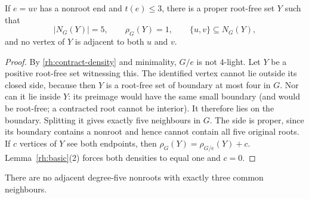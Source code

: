 \begin{lemma}\label{rh:blocker}
If $e=uv$ has a nonroot end and $t(e)\le3$, there is a proper root-free
set $Y$ such that
\[
 |N_G(Y)|=5,\qquad \rho_G(Y)=1,\qquad \{u,v\}\subseteq N_G(Y),
\]
and no vertex of $Y$ is adjacent to both $u$ and $v$.
\end{lemma}

\begin{proof}
By \eqref{rh:contract-density} and minimality, $G/e$ is not $4$-light.
Let $Y$ be a positive root-free set witnessing this. The identified
vertex cannot lie outside its closed side, because then $Y$ is a
root-free set of boundary at most four in $G$. Nor can it lie inside
$Y$: its preimage would have the same small boundary (and would be
root-free; a contracted root cannot be interior). It therefore lies
on the boundary. Splitting it gives exactly five neighbours in $G$.
The side is proper, since its boundary contains a nonroot and hence
cannot contain all five original roots. If $c$ vertices of $Y$ see
both endpoints, then
$\rho_G(Y)=\rho_{G/e}(Y)+c$. Lemma~\ref{rh:basic}(2) forces both
densities to equal one and $c=0$.
\end{proof}

\begin{lemma}\label{rh:five-edge}
There are no adjacent degree-five nonroots with exactly three common
neighbours.
\end{lemma}

